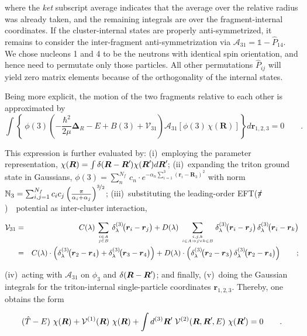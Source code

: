 \documentclass[aps,onecolumn,preprintnumbers,amsmath,amssymb,nofootinbib,superscriptaddress,notitlepage]{revtex4-1}
\newcommand{\eftnopi}{\mbox{EFT($\slashed{\pi}$) }}
\newcommand{\ve}[1]{\ensuremath{\boldsymbol{#1}}}
\newcommand*{\mprime}{^{\prime}\mkern-1.2mu}
\newcommand{\ddrei}[1]{\delta_{\tiny \lambda}^{(3)}\!\big(#1\big)}
\newcommand{\cc}{\ensuremath C(\lambda)}
\newcommand{\dd}{\ensuremath D(\lambda)}
\begin{document}
where the {\it ket} subscript average indicates that the average over the relative radius was already taken,
and the remaining integrals are over the fragment-internal coordinates. If the cluster-internal states are properly
anti-symmetrized, it remains to consider the inter-fragment anti-symmetrization via
 $\mathcal{A}_{31}=\mathbb{1}-\hat{P}_{14}$.
We chose nucleons 1 and 4 to be the neutrons with identical spin orientation, and hence need to permutate only
those particles. All other permutations $\hat{P}_{ij}$ will yield zero matrix elements because of the orthogonality of
the internal states.

Being more explicit, the motion of the two fragments relative to each other is approximated by
\begin{equation}\label{eq.rgm.eqom}
\int\left\lbrace~\phi(3)\left(-\frac{\hbar^2}{2\mu}\ve{\Delta}_R-E+B(3)+\mathcal{V}_{31}\right)
\mathcal{A}_{31}\left[\phi(3)\,\chi(\ve{R})\right]\right\rbrace d\ve{r}_{1,2,3}=0
\qquad.
\end{equation}

This expression is further evaluated by:
(i)~employing the parameter representation, $\chi(\ve{R})=\int\delta(\ve{R}-\ve{R}\mprime)\chi(\ve{R}\mprime)d\ve{R}\mprime$;
(ii)~expanding the triton ground state in Gaussians,
$\phi(3)=\sum_n^{N_f}\,c_n\cdot e^{-\alpha_n\sum_{i=1}^3\left(\ve{r}_i-\ve{R}_3\right)^2}$ with norm
$\mathbb{N}_3=\sum_{i,j=1}^{N_f}c_ic_j\left(\frac{\pi}{\alpha_i+\alpha_j}\right)^{\nicefrac{3}{2}}$;
(iii)~substituting the leading-order \eftnopi~potential as inter-cluster interaction,

\begin{eqnarray}\label{eq.app.pot}
\mathcal{V}_{31}
&=&
\cc\,\sum_{i\in A\atop j\in B}\,\ddrei{\ve{r}_i-\ve{r}_j}+
\dd\,\sum_{i,j,k\atop i\in A\Rightarrow j\vee k\in B}\ddrei{\ve{r}_i-\ve{r}_j}\,\ddrei{\ve{r}_i-\ve{r}_k}
\nonumber\\
&=&
\cc\cdot\left(\ddrei{\ve{r}_2-\ve{r}_4}+\ddrei{\ve{r}_3-\ve{r}_4}\right)
+\dd\cdot\left(\ddrei{\ve{r}_2-\ve{r}_3}\,\ddrei{\ve{r}_2-\ve{r}_4}\right)
\qquad;
\end{eqnarray}

(iv)~acting with $\mathcal{A}_{31}$ on $\phi_3$ and $\delta(\ve{R}-\ve{R}\mprime)$;
and finally, (v)~doing the Gaussian integrals for the triton-internal single-particle coordinates $\ve{r}_{1,2,3}$.
Thereby, one obtains the form

\begin{equation}\label{eq.app.rgmform}
(\hat{T}-E)~\chi(\ve{R})+\mathcal{V}^{(1)}(\ve{R})~\chi(\ve{R})+
\int d^{(3)}\ve{R}\mprime~\mathcal{V}^{(2)}(\ve{R},\ve{R}\mprime,E)~\chi(\ve{R}\mprime)=0
\qquad.
\end{equation}
\end{document}
